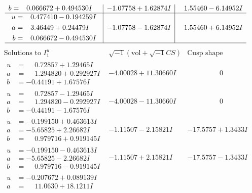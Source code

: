 \documentclass[1p]{elsarticle_modified}
\theoremstyle{definition}
\newcommand{\I}{\sqrt{-1}}
\begin{document}
$$\begin{array}{c|c|c}
\begin{aligned}
b &= \phantom{-}0.066672 + 0.494530 I\end{aligned}
 & -1.07758 + 1.62874 I & \phantom{-}1.55460 - 6.14952 I \\ \hline\begin{aligned}
u &= \phantom{-}0.477410 - 0.194259 I \\
a &= \phantom{-}3.46449 + 0.24479 I \\
b &= \phantom{-}0.066672 - 0.494530 I\end{aligned}
 & -1.07758 - 1.62874 I & \phantom{-}1.55460 + 6.14952 I\\
 \hline 
 \end{array}$$\newpage$$\begin{array}{c|c|c}  
\text{Solutions to }I^u_{1}& \I (\text{vol} + \sqrt{-1}CS) & \text{Cusp shape}\\
 \hline 
\begin{aligned}
u &= \phantom{-}0.72857 + 1.29465 I \\
a &= \phantom{-}1.294820 + 0.292927 I \\
b &= -0.44191 + 1.67576 I\end{aligned}
 & -4.00028 + 11.30660 I & \phantom{-0.000000 } 0 \\ \hline\begin{aligned}
u &= \phantom{-}0.72857 - 1.29465 I \\
a &= \phantom{-}1.294820 - 0.292927 I \\
b &= -0.44191 - 1.67576 I\end{aligned}
 & -4.00028 - 11.30660 I & \phantom{-0.000000 } 0 \\ \hline\begin{aligned}
u &= -0.199150 + 0.463613 I \\
a &= -5.65825 + 2.26682 I \\
b &= \phantom{-}0.979716 + 0.919145 I\end{aligned}
 & -1.11507 - 2.15821 I & -17.5757 + 1.3433 I \\ \hline\begin{aligned}
u &= -0.199150 - 0.463613 I \\
a &= -5.65825 - 2.26682 I \\
b &= \phantom{-}0.979716 - 0.919145 I\end{aligned}
 & -1.11507 + 2.15821 I & -17.5757 - 1.3433 I \\ \hline\begin{aligned}
u &= -0.207672 + 0.089139 I \\
a &= \phantom{-}11.0630 + 18.1211 I \\

\end{aligned}
\end{array}$$
\end{document}

